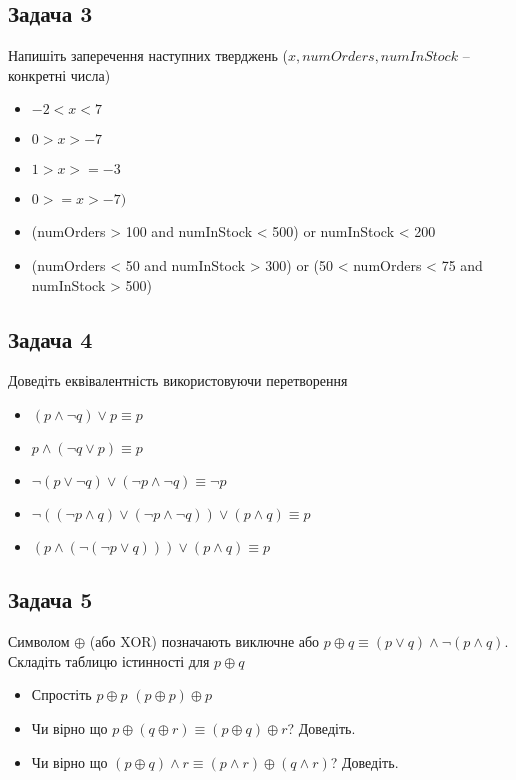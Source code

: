 \documentclass{article}
\begin{document}
\subsection*{Задача 3}
Напишіть заперечення наступних тверджень ($x, numOrders, numInStock$ -- конкретні числа)
\begin{itemize}
    \item $-2 < x < 7$
    \item $0 > x > -7$
    \item $1 > x >= -3$
    \item $0 >= x > -7)$
    \item (numOrders > 100 and numInStock < 500) or numInStock < 200
    \item (numOrders < 50 and numInStock > 300) or (50 < numOrders < 75 and numInStock > 500)
\end{itemize}

\subsection*{Задача 4}
Доведіть еквівалентність використовуючи перетворення
\begin{itemize}
    \item $(p \land \lnot q) \lor p \equiv p$
    \item $p \land (\lnot q \lor p) \equiv p$
    \item $\lnot(p \lor \lnot q) \lor (\lnot p \land \lnot q) \equiv \lnot p$
    \item $ \lnot ((\lnot p \land q) \lor (\lnot p \land \lnot q)) \lor (p \land q) \equiv p$
    \item $(p \land (\lnot (\lnot p \lor q))) \lor (p \land q) \equiv p$
\end{itemize}

\subsection*{Задача 5}
Символом $\oplus$ (або XOR) позначають виключне або $p \oplus q \equiv (p \lor q) \land \lnot (p \land q)$.
Складіть таблицю істинності для $p \oplus q$
\begin{itemize}
    \item Спростіть $p \oplus p$ $(p \oplus p) \oplus p$
    \item Чи вірно що $p \oplus (q \oplus r) \equiv (p \oplus q) \oplus r$? Доведіть.
    \item Чи вірно що $(p \oplus q) \land r \equiv (p \land r) \oplus (q \land r)$? Доведіть.
\end{itemize}
\end{document}
